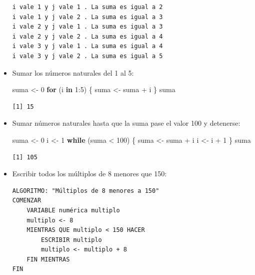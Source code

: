 \documentclass[
]{book}
\newenvironment{Shaded}{\begin{snugshade}}{\end{snugshade}}
\newcommand{\ControlFlowTok}[1]{\textcolor[rgb]{0.13,0.29,0.53}{\textbf{#1}}}
\newcommand{\DecValTok}[1]{\textcolor[rgb]{0.00,0.00,0.81}{#1}}
\newcommand{\NormalTok}[1]{#1}
\newcommand{\OtherTok}[1]{\textcolor[rgb]{0.56,0.35,0.01}{#1}}
\newcommand{\SpecialCharTok}[1]{\textcolor[rgb]{0.00,0.00,0.00}{#1}}
\begin{document}
\begin{itemize}
\begin{verbatim}
i vale 1 y j vale 1 . La suma es igual a 2 
i vale 1 y j vale 2 . La suma es igual a 3 
i vale 2 y j vale 1 . La suma es igual a 3 
i vale 2 y j vale 2 . La suma es igual a 4 
i vale 3 y j vale 1 . La suma es igual a 4 
i vale 3 y j vale 2 . La suma es igual a 5 
\end{verbatim}
\item
  Sumar los números naturales del 1 al 5:

\begin{Shaded}
\begin{Highlighting}[]
\NormalTok{suma }\OtherTok{\textless{}{-}} \DecValTok{0}
\ControlFlowTok{for}\NormalTok{ (i }\ControlFlowTok{in} \DecValTok{1}\SpecialCharTok{:}\DecValTok{5}\NormalTok{) \{}
\NormalTok{    suma }\OtherTok{\textless{}{-}}\NormalTok{ suma }\SpecialCharTok{+}\NormalTok{ i}
\NormalTok{\}}
\NormalTok{suma}
\end{Highlighting}
\end{Shaded}

\begin{verbatim}
[1] 15
\end{verbatim}
\item
  Sumar números naturales hasta que la suma pase el valor 100 y detenerse:

\begin{Shaded}
\begin{Highlighting}[]
\NormalTok{suma }\OtherTok{\textless{}{-}} \DecValTok{0}
\NormalTok{i }\OtherTok{\textless{}{-}} \DecValTok{1}
\ControlFlowTok{while}\NormalTok{ (suma }\SpecialCharTok{\textless{}} \DecValTok{100}\NormalTok{) \{}
\NormalTok{    suma }\OtherTok{\textless{}{-}}\NormalTok{  suma }\SpecialCharTok{+}\NormalTok{ i}
\NormalTok{    i }\OtherTok{\textless{}{-}}\NormalTok{ i }\SpecialCharTok{+} \DecValTok{1}
\NormalTok{\}}
\NormalTok{suma}
\end{Highlighting}
\end{Shaded}

\begin{verbatim}
[1] 105
\end{verbatim}
\item
  Escribir todos los múltiplos de 8 menores que 150:

\begin{verbatim}
ALGORITMO: "Múltiplos de 8 menores a 150"
COMENZAR
    VARIABLE numérica multiplo
    multiplo <- 8
    MIENTRAS QUE multiplo < 150 HACER
        ESCRIBIR multiplo
        multiplo <- multiplo + 8
    FIN MIENTRAS
FIN
\end{verbatim}


\end{itemize}
\end{document}
